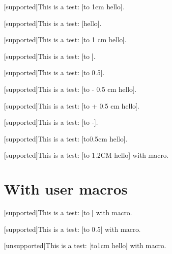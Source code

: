 \documentclass{revtex4-1}
\def\Supported{{\color{darkgreen} [supported]}}
\def\Unsupported{{\color{red} [unsupported]}}
\begin{document}
\Supported This is a test: [\hbox to 1cm {hello}].

\Supported This is a test: [\hbox {hello}].





\Supported This is a test: [\hbox to 1 cm {hello}]. %

\Supported This is a test: [\hbox to \textwidth {hello}]. %

\Supported This is a test: [\hbox to 0.5\textwidth {hello}]. %


\Supported This is a test: [\hbox to - 0.5 cm {hello}]. %

\Supported This is a test: [\hbox to + 0.5 cm {hello}]. %


\Supported This is a test: [\hbox to -\textwidth {hello}]. %

\Supported This is a test: [\hbox to0.5cm {hello}]. %

\Supported This is a test: [\hbox to 1.2CM {hello}] with macro. %


\section{With user macros}

\def\textw{\textwidth}
\Supported This is a test: [\hbox to \textw {hello}] with macro. %

\def\phrase{to 0.5\textwidth}
\Supported This is a test: [\hbox \phrase {hello}] with macro. %

\def\A{o}
\Unsupported This is a test: [\hbox t\A 1cm {hello}] with macro. %
\end{document}
